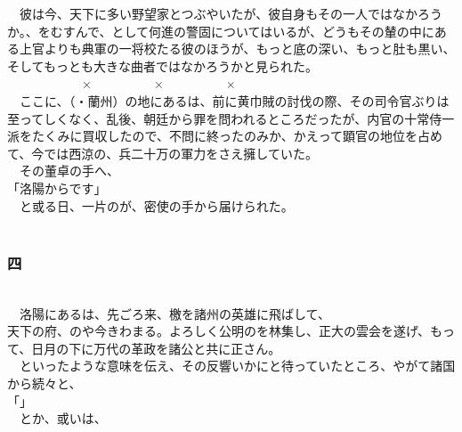 \documentclass[
  paper=a5,
  fontsize=10pt,
  jafontsize=9.5pt,
  tate,                  %
  open_bracket_pos=nibu, %
]{jlreq}
\begin{document}
　彼は今、天下に多い野望家とつぶやいたが、彼自身もその一人ではなかろうか。、をむすんで、として何進の警固についてはいるが、どうもその輦の中にある上官よりも典軍の一将校たる彼のほうが、もっと底の深い、もっと肚も黒い、そしてもっとも大きな曲者ではなかろうかと見られた。\\


　　　　　　×　　　　　×　　　　　×\\


　ここに、（・蘭州）の地にあるは、前に黄巾賊の討伐の際、その司令官ぶりは至ってしくなく、乱後、朝廷から罪を問われるところだったが、内官の十常侍一派をたくみに買収したので、不問に終ったのみか、かえって顕官の地位を占めて、今では西涼の、兵二十万の軍力をさえ擁していた。\\


　その董卓の手へ、\\


「洛陽からです」\\


　と或る日、一片のが、密使の手から届けられた。\\

\\

\subsubsection{四}

\\


　洛陽にあるは、先ごろ来、檄を諸州の英雄に飛ばして、\\



天下の府、のや今きわまる。よろしく公明のを林集し、正大の雲会を遂げ、もって、日月の下に万代の革政を諸公と共に正さん。\\



　といったような意味を伝え、その反響いかにと待っていたところ、やがて諸国から続々と、\\


「」\\


　とか、或いは、\\
\end{document}
